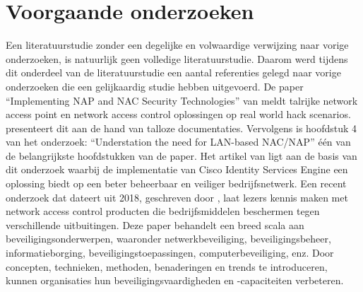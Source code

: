 \section{Voorgaande onderzoeken}
Een literatuurstudie zonder een degelijke en volwaardige verwijzing naar vorige onderzoeken, is natuurlijk geen volledige literatuurstudie. Daarom werd tijdens dit onderdeel van de literatuurstudie een aantal referenties gelegd naar vorige onderzoeken die een gelijkaardig studie hebben uitgevoerd.
\newline
\newline
De paper “Implementing NAP and NAC Security Technologies” van \cite{DanielV} meldt talrijke network access point en network access control oplossingen op real world hack scenarios. \cite{DanielV} presenteert dit aan de hand van talloze documentaties. Vervolgens is hoofdstuk 4 van het onderzoek: “Understation the need for LAN-based NAC/NAP” één van de belangrijkste hoofdstukken van de paper. Het artikel van \cite{DanielV} ligt aan de basis van dit onderzoek waarbij de implementatie van Cisco Identity Services Engine een oplossing biedt op een beter beheerbaar en veiliger bedrijfsnetwerk.
\newline
\newline 
Een recent onderzoek dat dateert uit 2018, geschreven door \cite{KevinDaimi}, laat lezers kennis maken met network access control producten die bedrijfsmiddelen beschermen tegen verschillende uitbuitingen. Deze paper behandelt een breed scala aan beveiligingsonderwerpen, waaronder netwerkbeveiliging, beveiligingsbeheer, informatieborging, beveiligingstoepassingen, computerbeveiliging, enz. Door concepten, technieken, methoden, benaderingen en trends te introduceren, kunnen organisaties hun beveiligingsvaardigheden en -capaciteiten verbeteren. 

